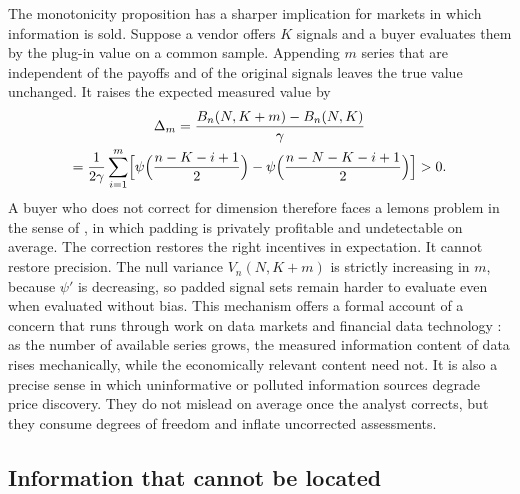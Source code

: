 The monotonicity proposition has a sharper implication for markets in which information is sold. Suppose a vendor offers $K$ signals and a buyer evaluates them by the plug-in value on a common sample. Appending $m$ series that are independent of the payoffs and of the original signals leaves the true value unchanged. It raises the expected measured value by
\begin{multline*}
 \Delta_m=\frac{B_n(N,K+m)-B_n(N,K)}\gamma\\
 =\frac1{2\gamma}\sum_{i=1}^m\Bigl[\psi\Bigl(\frac{n-K-i+1}2\Bigr)-\psi\Bigl(\frac{n-N-K-i+1}2\Bigr)\Bigr]>0.
\end{multline*}
A buyer who does not correct for dimension therefore faces a lemons problem in the sense of \citet{akerlof1970market}, in which padding is privately profitable and undetectable on average. The correction restores the right incentives in expectation. It cannot restore precision. The null variance $V_n(N,K+m)$ is strictly increasing in $m$, because $\psi'$ is decreasing, so padded signal sets remain harder to evaluate even when evaluated without bias. This mechanism offers a formal account of a concern that runs through work on data markets and financial data technology \citep{farboodi2020long}: as the number of available series grows, the measured information content of data rises mechanically, while the economically relevant content need not. It is also a precise sense in which uninformative or polluted information sources degrade price discovery. They do not mislead on average once the analyst corrects, but they consume degrees of freedom and inflate uncorrected assessments.

\subsection*{Information that cannot be located}

